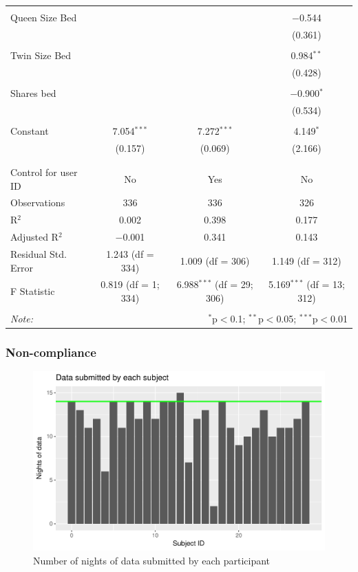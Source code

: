 \documentclass[]{article}
\begin{document}
\begin{table}[!htbp]
\begin{tabular}{@{\extracolsep{5pt}}lccc}
  & & & \\ 
 Queen Size Bed &  &  & $-$0.544 \\ 
  &  &  & (0.361) \\ 
  & & & \\ 
 Twin Size Bed &  &  & 0.984$^{**}$ \\ 
  &  &  & (0.428) \\ 
  & & & \\ 
 Shares bed &  &  & $-$0.900$^{*}$ \\ 
  &  &  & (0.534) \\ 
  & & & \\ 
 Constant & 7.054$^{***}$ & 7.272$^{***}$ & 4.149$^{*}$ \\ 
  & (0.157) & (0.069) & (2.166) \\ 
  & & & \\ 
\hline \\[-1.8ex] 
Control for user ID & No & Yes & No \\ 
Observations & 336 & 336 & 326 \\ 
R$^{2}$ & 0.002 & 0.398 & 0.177 \\ 
Adjusted R$^{2}$ & $-$0.001 & 0.341 & 0.143 \\ 
Residual Std. Error & 1.243 (df = 334) & 1.009 (df = 306) & 1.149 (df = 312) \\ 
F Statistic & 0.819 (df = 1; 334) & 6.988$^{***}$ (df = 29; 306) & 5.169$^{***}$ (df = 13; 312) \\ 
\hline 
\hline \\[-1.8ex] 
\textit{Note:}  & \multicolumn{3}{r}{$^{*}$p$<$0.1; $^{**}$p$<$0.05; $^{***}$p$<$0.01} \\ 
\end{tabular} 
\end{table}

\hypertarget{non-compliance}{%
\subsubsection{Non-compliance}\label{non-compliance}}

\begin{figure}
\centering
\includegraphics{report_files/figure-latex/days_used-1.pdf}
\caption{\label{fig:days_used} Number of nights of data submitted by
each participant}
\end{figure}
\end{document}

